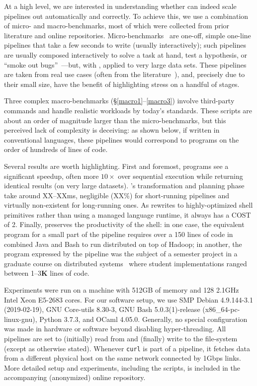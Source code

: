 \documentclass[sigplan,10pt,review,anonymous]{acmart}
\newcommand{\ttt}[1]{\texttt{\small #1}}
\newcommand{\wkq}{\ttt{q\textsubscript{1-4}}}
\newcommand{\todo}[1]{\hl{#1}\xspace}
\begin{document}
At a high level, we are interested in understanding whether \sys can indeed scale pipelines out automatically and correctly.
To achieve this, we use a combination of micro- and macro-benchmarks, most of which were collected from prior literature and online repositories.
Micro-benchmarks~ are one-off, simple one-line pipelines that take a few seconds to write (usually interactively);
  such pipelines are usually composed interactively to solve a task at hand, test a hypothesis, or ``smoke out bugs''~\cite{bentley1986literate}---but, with \sys, applied to very large data sets.
These pipelines are taken from real use cases (often from the literature~\cite{bentley1985spelling, bentley1985spelling}), and, precisely due to their small size, have the benefit of highlighting stress on a handful of stages.

Three complex macro-benchmarks (\S\ref{macro1}--\ref{macro3}) involve third-party commands and handle realistic workloads by today's standards.
These scripts are about an order of magnitude larger than the micro-benchmarks, but this perceived lack of complexity is deceiving:
  as shown below, if written in conventional languages, these pipelines would correspond to programs on the order of hundreds of lines of code.

Several results are worth highlighting.
First and foremost, programs see a significant speedup, often more $10\times$ over sequential execution  while returning identical results (on very large datasets).
\sys's transformation and planning phase take around XX--XXms, negligible (XX\%) for short-running pipelines and virtually non-existent for long-running ones.
As \sys rewrites to highly-optimized shell primitives rather than using a managed language runtime, it always has a COST~\cite{mcsherryscalability} of 2.
Finally, \sys preserves the productivity of the shell:
  in one case, the equivalent program for a small part of the pipeline requires over a 150 lines of code in combined Java and Bash to run distributed on top of Hadoop;
  in another, the program expressed by the pipeline was the subject of a semester project in a graduate course on distributed systems~\cite{blinded} where student implementations ranged between 1--3\textbf{K} lines of code.

Experiments were run on a %
 machine with 512GB of memory and 128 2.1GHz Intel Xeon E5-2683 cores.
For our software setup, we use SMP Debian 4.9.144-3.1 (2019-02-19), GNU Core-utils 8.30-3, GNU Bash 5.0.3(1)-release (x86\_64-pc-linux-gnu), Python 3.7.3, and OCaml 4.05.0.
Generally, no special configuration was made in hardware or software beyond disabling hyper-threading. %
All pipelines are set to (initially) read from and (finally) write to the file-system (except as otherwise stated).
Whenever \ttt{curl} is part of a pipeline, it fetches data from a different physical host on the same network connected by 1Gbps links.
More detailed setup and experiments, including the scripts, is included in the accompanying (anonymized) online repository.
\end{document}
